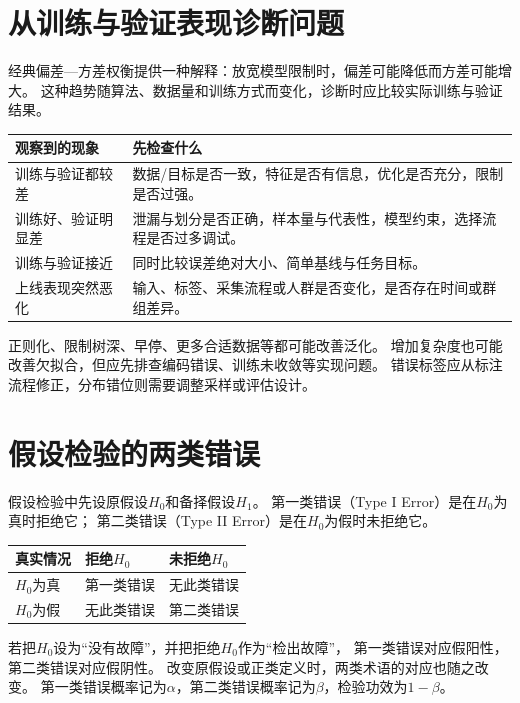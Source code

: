 \section{从训练与验证表现诊断问题}
\label{sec:learn-diagnosis}
经典偏差—方差权衡提供一种解释：放宽模型限制时，偏差可能降低而方差可能增大。
这种趋势随算法、数据量和训练方式而变化，诊断时应比较实际训练与验证结果。

\begin{center}
\begin{tabularx}{\textwidth}{P{37mm}Y}
\toprule
观察到的现象 & 先检查什么\\
\midrule
训练与验证都较差 & 数据/目标是否一致，特征是否有信息，优化是否充分，限制是否过强。\\
训练好、验证明显差 & 泄漏与划分是否正确，样本量与代表性，模型约束，选择流程是否过多调试。\\
训练与验证接近 & 同时比较误差绝对大小、简单基线与任务目标。\\
上线表现突然恶化 & 输入、标签、采集流程或人群是否变化，是否存在时间或群组差异。\\
\bottomrule
\end{tabularx}
\end{center}

正则化、限制树深、早停、更多合适数据等都可能改善泛化。
增加复杂度也可能改善欠拟合，但应先排查编码错误、训练未收敛等实现问题。
错误标签应从标注流程修正，分布错位则需要调整采样或评估设计。


\section{假设检验的两类错误}
\label{sec:learn-testing-errors}
假设检验中先设原假设$H_0$和备择假设$H_1$。
第一类错误（Type I Error）是在$H_0$为真时拒绝它；
第二类错误（Type II Error）是在$H_0$为假时未拒绝它。

\begin{center}
\begin{tabularx}{\textwidth}{P{45mm}YY}
\toprule
真实情况 & 拒绝$H_0$ & 未拒绝$H_0$\\
\midrule
$H_0$为真 & 第一类错误 & 无此类错误\\
$H_0$为假 & 无此类错误 & 第二类错误\\
\bottomrule
\end{tabularx}
\end{center}

若把$H_0$设为“没有故障”，并把拒绝$H_0$作为“检出故障”，
第一类错误对应假阳性，第二类错误对应假阴性。
改变原假设或正类定义时，两类术语的对应也随之改变。
第一类错误概率记为$\alpha$，第二类错误概率记为$\beta$，检验功效为$1-\beta$。

